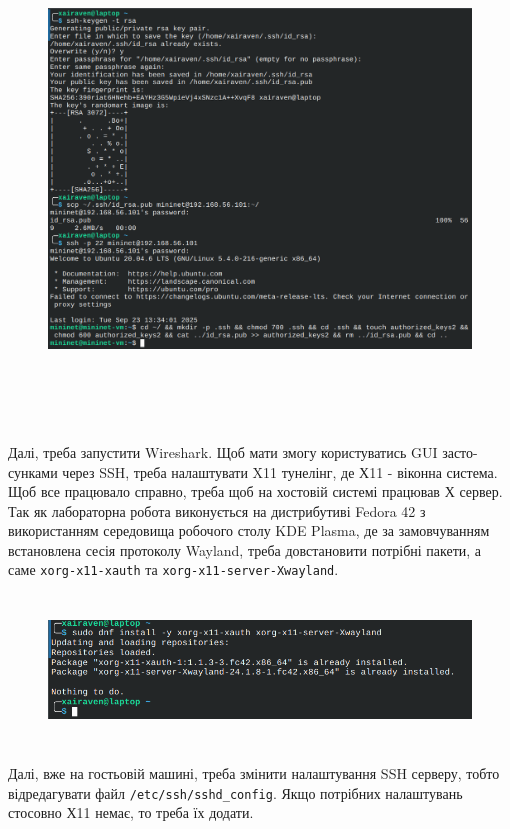 \documentclass[14pt, a4paper]{extreport}
\begin{document}
	\begin{figure}[H]
		\centering
		\includegraphics[height=13cm]{02} 
	\end{figure}
	
	Далі, треба запустити Wireshark. Щоб мати змогу користуватись GUI засто\hyp{}сунками через SSH, треба налаштувати X11 тунелінг, де Х11 - віконна система. Щоб все працювало справно, треба щоб на хостовій системі працював Х сервер. Так як лабораторна робота виконується на дистрибутиві Fedora 42 з використанням середовища робочого столу KDE Plasma, де за замовчуванням встановлена сесія протоколу Wayland, треба довстановити потрібні пакети, а саме \texttt{xorg-x11-xauth} та \texttt{xorg-x11-server-Xwayland}. 
	
	\begin{figure}[H]
		\centering
		\includegraphics[height=4cm]{03} 
	\end{figure}
	
	Далі, вже на гостьовій машині, треба змінити налаштування SSH серверу, тобто відредагувати файл \texttt{/etc/ssh/sshd\_config}. Якщо потрібних налаштувань стосовно Х11 немає, то треба їх додати.
	
\end{document}
